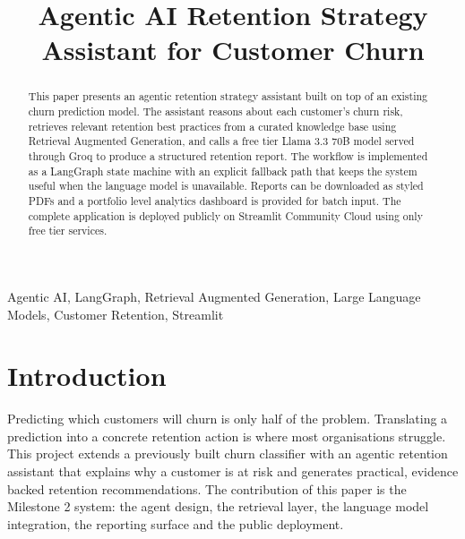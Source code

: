 \documentclass[conference]{IEEEtran}
\begin{document}
\title{Agentic AI Retention Strategy Assistant for Customer Churn}

\author{
}

\maketitle

\begin{abstract}
This paper presents an agentic retention strategy assistant built on top of an existing churn prediction model. The assistant reasons about each customer's churn risk, retrieves relevant retention best practices from a curated knowledge base using Retrieval Augmented Generation, and calls a free tier Llama 3.3 70B model served through Groq to produce a structured retention report. The workflow is implemented as a LangGraph state machine with an explicit fallback path that keeps the system useful when the language model is unavailable. Reports can be downloaded as styled PDFs and a portfolio level analytics dashboard is provided for batch input. The complete application is deployed publicly on Streamlit Community Cloud using only free tier services.
\end{abstract}

\begin{IEEEkeywords}
Agentic AI, LangGraph, Retrieval Augmented Generation, Large Language Models, Customer Retention, Streamlit
\end{IEEEkeywords}

\section{Introduction}
Predicting which customers will churn is only half of the problem. Translating a prediction into a concrete retention action is where most organisations struggle. This project extends a previously built churn classifier with an agentic retention assistant that explains why a customer is at risk and generates practical, evidence backed retention recommendations. The contribution of this paper is the Milestone 2 system: the agent design, the retrieval layer, the language model integration, the reporting surface and the public deployment.
\end{document}
